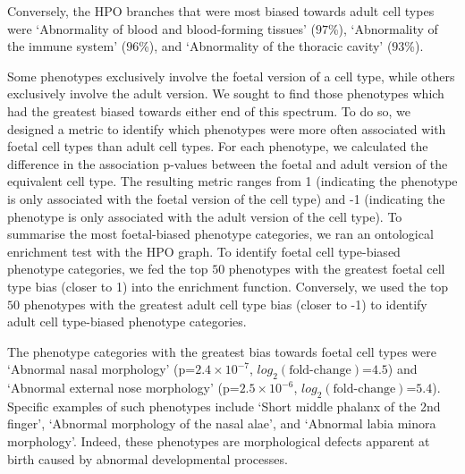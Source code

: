 \documentclass[
]{article}
\begin{document}
Conversely, the HPO branches that were most biased towards adult cell
types were `Abnormality of blood and blood-forming tissues' (\(97\)\%),
`Abnormality of the immune system' (\(96\)\%), and `Abnormality of the
thoracic cavity' (\(93\)\%).

Some phenotypes exclusively involve the foetal version of a cell type,
while others exclusively involve the adult version. We sought to find
those phenotypes which had the greatest biased towards either end of
this spectrum. To do so, we designed a metric to identify which
phenotypes were more often associated with foetal cell types than adult
cell types. For each phenotype, we calculated the difference in the
association p-values between the foetal and adult version of the
equivalent cell type. The resulting metric ranges from 1 (indicating the
phenotype is only associated with the foetal version of the cell type)
and -1 (indicating the phenotype is only associated with the adult
version of the cell type). To summarise the most foetal-biased phenotype
categories, we ran an ontological enrichment test with the HPO graph. To
identify foetal cell type-biased phenotype categories, we fed the top
\(50\) phenotypes with the greatest foetal cell type bias (closer to 1)
into the enrichment function. Conversely, we used the top \(50\)
phenotypes with the greatest adult cell type bias (closer to -1) to
identify adult cell type-biased phenotype categories.

The phenotype categories with the greatest bias towards foetal cell
types were `Abnormal nasal morphology' (p=\(2.4 \times 10^{-7}\),
\(log_2(\text{fold-change})\)=\(4.5\)) and `Abnormal external nose
morphology' (p=\(2.5 \times 10^{-6}\),
\(log_2(\text{fold-change})\)=\(5.4\)). Specific examples of such
phenotypes include `Short middle phalanx of the 2nd finger', `Abnormal
morphology of the nasal alae', and `Abnormal labia minora morphology'.
Indeed, these phenotypes are morphological defects apparent at birth
caused by abnormal developmental processes.
\end{document}
